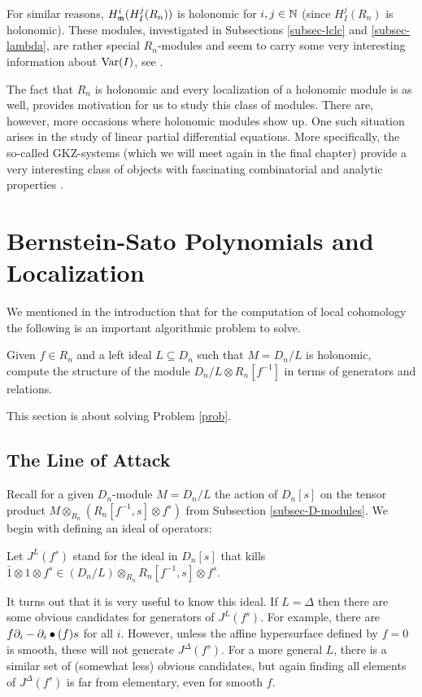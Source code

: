 For similar reasons, $H^i_{\mathfrak m} (H^j_I(R_n))$ is holonomic for
$i,j\in {\mathbb N}$ (since $H^j_I(R_n)$ is holonomic).  
These modules, investigated in Subsections \ref{subsec-lclc} and
\ref{subsec-lambda}, are 
rather special $R_n$-modules and seem to carry some very interesting
information about $\operatorname{Var}(I)$, see \cite{DM:G-S,DM:W-lambda}. 

The fact that $R_n$ is holonomic and every localization of a holonomic
module is as well, provides motivation for us to study this class of
modules. There are, however, more occasions where holonomic modules
show up. One such situation arises in the study of linear partial
differential equations. More specifically, the so-called GKZ-systems
(which we will meet again in the final chapter) provide a very
interesting class of objects with fascinating combinatorial and
analytic properties \cite{DM:SST}. 


%
\section{Bernstein-Sato Polynomials and Localization}
We mentioned in the introduction that for the computation
of local cohomology the following is an
important algorithmic problem to solve.

\begin{problem}
Given $f\in  
R_n$ and a left ideal $L\subseteq D_n$ such that $M=D_n/L$ is holonomic,  
compute the structure of the module 
$D_n/L\otimes R_n[f^{-1}]$ in terms of generators and relations. 
\end{problem}
This section is about solving Problem \ref{prob}.
\subsection{The Line of Attack}
Recall for a given $D_n$-module $M=D_n/L$ the action of $D_n[s]$ on the
tensor product $M\otimes_{R_n}(R_n[f^{-1},s]\otimes f^s)$ from
Subsection \ref{subsec-D-modules}. 
We begin with defining an ideal of operators:
\begin{definition}
Let  $J^L(f^s)$ stand for the ideal in $D_n[s]$
that kills $\bar 1\otimes 1\otimes f^s\in (D_n/L)\otimes_{R_n}
R_n[f^{-1},s]\otimes f^s$. 
\end{definition}
It turns out that it is very useful to know this ideal.
If $L=\Delta$ then there are some obvious candidates for generators of
$J^L(f^s)$. For example, there are $f\partial_i-\partial_i\bullet(f)s$ for all
$i$. However, unless the affine hypersurface defined by $f=0$ is smooth, these will not generate
$J^\Delta(f^s)$. For a more general $L$, there is a similar set of
(somewhat less) obvious candidates, but again finding all elements of
$J^\Delta(f^s)$ is far from elementary, even for smooth $f$.


